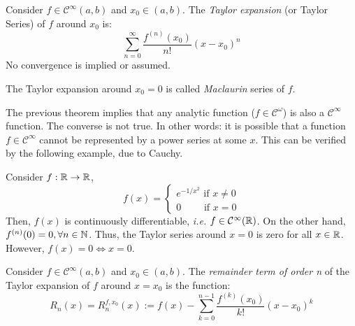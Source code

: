 \begin{definition}
    Consider $f \in \mathcal{C}^\infty(a,b)$ and $x_0 \in (a,b)$. The \emph{Taylor expansion} (or Taylor Series) of $f$ around $x_0$ is:
    \begin{equation*}
        \sum \limits_{n=0}^\infty \frac{f^{(n)}(x_0)}{n!}(x - x_0)^n
    \end{equation*}
    No convergence is implied or assumed.
\end{definition}

\begin{remark}
    The Taylor expansion around $x_0 = 0$ is called \emph{Maclaurin} series of $f$.
\end{remark}

The previous theorem implies that any analytic function ($f \in \mathcal{C}^\omega$) is also a $\mathcal{C}^\infty$ function. The converse is not true. In other words: it is possible that a function $f \in \mathcal{C}^\infty$ cannot be represented by a power series at some $x$. This can be verified by the following example, due to Cauchy.

\begin{eg}
    Consider $f: \mathbb{R} \to \mathbb{R}$,
    \begin{equation*}
        f(x) = \begin{cases}
            e^{-1/x^2} \text{ if } x \neq 0\\
            0 \hspace{2em}\text{ if } x = 0 
        \end{cases}
    \end{equation*}
    Then, $f(x)$ is continuously differentiable, \emph{i.e.} $f \in \mathcal{C}^\infty(\mathbb{R})$. On the other hand, $f^{(n)}(0) = 0, \forall n \in \mathbb{N}$. Thus, the Taylor series around $x = 0$ is zero for all $x \in \mathbb{R}$. However, $f(x) = 0 \Longleftrightarrow x = 0$. 
\end{eg}

\begin{definition}
    Consider $f \in \mathcal{C}^\infty(a,b)$ and $x_0 \in (a,b)$. The \emph{remainder term of order n} of the Taylor expansion of $f$ around $x = x_0$ is the function:
    \begin{equation*}
        R_n(x) = R_n^{f, x_0}(x) := f(x) - \sum \limits_{k=0}^{n-1}\frac{f^{(k)}(x_0)}{k!}(x - x_0)^k
    \end{equation*}
\end{definition}

